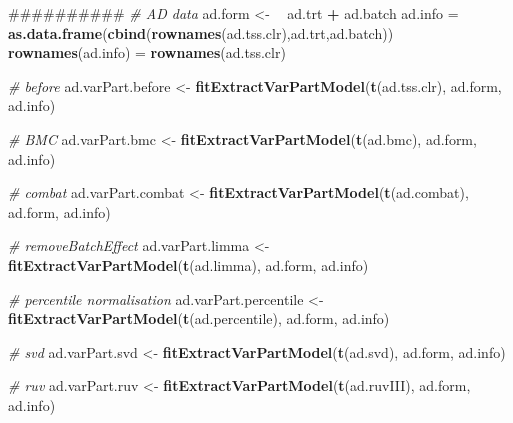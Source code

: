 \documentclass[]{book}
\newenvironment{Shaded}{\begin{snugshade}}{\end{snugshade}}
\newcommand{\KeywordTok}[1]{\textcolor[rgb]{0.13,0.29,0.53}{\textbf{#1}}}
\newcommand{\StringTok}[1]{\textcolor[rgb]{0.31,0.60,0.02}{#1}}
\newcommand{\CommentTok}[1]{\textcolor[rgb]{0.56,0.35,0.01}{\textit{#1}}}
\newcommand{\OperatorTok}[1]{\textcolor[rgb]{0.81,0.36,0.00}{\textbf{#1}}}
\newcommand{\ErrorTok}[1]{\textcolor[rgb]{0.64,0.00,0.00}{\textbf{#1}}}
\newcommand{\NormalTok}[1]{#1}
\begin{document}
\begin{Shaded}
\begin{Highlighting}[]
\NormalTok{##########}
\CommentTok{# AD data}
\NormalTok{ad.form <-}\StringTok{ }\ErrorTok{~}\StringTok{ }\NormalTok{ad.trt }\OperatorTok{+}\StringTok{ }\NormalTok{ad.batch}
\NormalTok{ad.info =}\StringTok{ }\KeywordTok{as.data.frame}\NormalTok{(}\KeywordTok{cbind}\NormalTok{(}\KeywordTok{rownames}\NormalTok{(ad.tss.clr),ad.trt,ad.batch))}
\KeywordTok{rownames}\NormalTok{(ad.info) =}\StringTok{ }\KeywordTok{rownames}\NormalTok{(ad.tss.clr)}

\CommentTok{# before}
\NormalTok{ad.varPart.before <-}\StringTok{ }\KeywordTok{fitExtractVarPartModel}\NormalTok{(}\KeywordTok{t}\NormalTok{(ad.tss.clr), ad.form, ad.info)}

\CommentTok{# BMC}
\NormalTok{ad.varPart.bmc <-}\StringTok{ }\KeywordTok{fitExtractVarPartModel}\NormalTok{(}\KeywordTok{t}\NormalTok{(ad.bmc), ad.form, ad.info)}

\CommentTok{# combat}
\NormalTok{ad.varPart.combat <-}\StringTok{ }\KeywordTok{fitExtractVarPartModel}\NormalTok{(}\KeywordTok{t}\NormalTok{(ad.combat), ad.form, ad.info)}

\CommentTok{# removeBatchEffect}
\NormalTok{ad.varPart.limma <-}\StringTok{ }\KeywordTok{fitExtractVarPartModel}\NormalTok{(}\KeywordTok{t}\NormalTok{(ad.limma), ad.form, ad.info)}

\CommentTok{# percentile normalisation}
\NormalTok{ad.varPart.percentile <-}\StringTok{ }\KeywordTok{fitExtractVarPartModel}\NormalTok{(}\KeywordTok{t}\NormalTok{(ad.percentile), ad.form, ad.info)}

\CommentTok{# svd}
\NormalTok{ad.varPart.svd <-}\StringTok{ }\KeywordTok{fitExtractVarPartModel}\NormalTok{(}\KeywordTok{t}\NormalTok{(ad.svd), ad.form, ad.info)}

\CommentTok{# ruv}
\NormalTok{ad.varPart.ruv <-}\StringTok{ }\KeywordTok{fitExtractVarPartModel}\NormalTok{(}\KeywordTok{t}\NormalTok{(ad.ruvIII), ad.form, ad.info)}



\end{Highlighting}
\end{Shaded}
\end{document}
